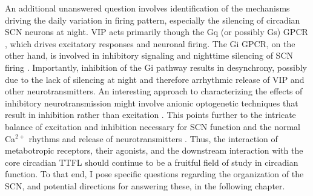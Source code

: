 An additional unanswered question involves identification of the mechanisms driving the daily variation in firing pattern, especially the silencing of circadian SCN neurons at night.
VIP acts primarily though the Gq (or possibly Gs) GPCR \cite{Brancaccio2013}, which drives excitatory responses and neuronal firing.
The Gi GPCR, on the other hand, is involved in inhibitory signaling and nighttime silencing of SCN firing \cite{Aton2006}.
Importantly, inhibition of the Gi pathway results in desynchrony, possibly due to the lack of silencing at night and therefore arrhythmic release of VIP and other neurotransmitters.
An interesting approach to characterizing the effects of inhibitory neurotransmission might involve anionic optogenetic techniques that result in inhibition rather than excitation \cite{Govorunova2015}.
This points further to the intricate balance of excitation and inhibition necessary for SCN function and the normal Ca$^{2+}$ rhythms and release of neurotransmitters \cite{Kingsbury2016, Noguchi2017}.
Thus, the interaction of metabotropic receptors, their agonists, and the downstream interaction with the core circadian TTFL should continue to be a fruitful field of study in circadian function.
To that end, I pose specific questions regarding the organization of the SCN, and potential directions for answering these, in the following chapter.

















